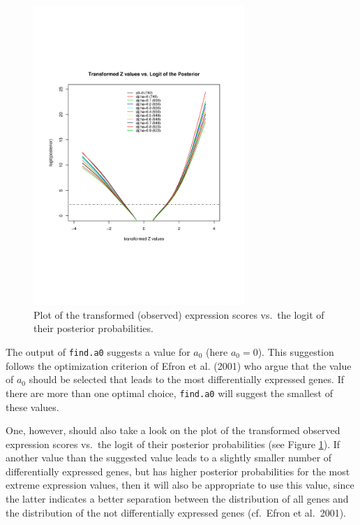 \documentclass[a4paper]{article}
\renewcommand{\baselinestretch}{1.1}
\begin{document}
\begin{figure}[!h]
\vspace{18pt} \small \renewcommand{\baselinestretch}{1.2}
\centerline{
\includegraphics[width=8cm]{logitpost}}\vspace{-12pt}
\caption{Plot of the transformed (observed) expression scores vs.\
the logit of their posterior probabilities.}\label{logitpost}
\end{figure}

The output of \texttt{find.a0} suggests a value for
$a_0$ (here $a_0=0$). This suggestion follows the optimization
criterion of Efron et al. (2001) who argue that the value of $a_0$
should be selected that leads to the most differentially expressed
genes. If there are more than one optimal choice, \texttt{find.a0}
will suggest the smallest of these values.

One, however, should also take a look on the plot of the
transformed observed expression scores vs.\ the logit of their
posterior probabilities (see Figure \ref{logitpost}). If another
value than the suggested value leads to a slightly smaller number
of differentially expressed genes, but has higher posterior
probabilities for the most extreme expression values, then it will
also be appropriate to use this value, since the latter indicates
a better separation between the distribution of all genes and the
distribution of the not differentially expressed genes (cf.\ Efron
et al.\ 2001).
\end{document}
